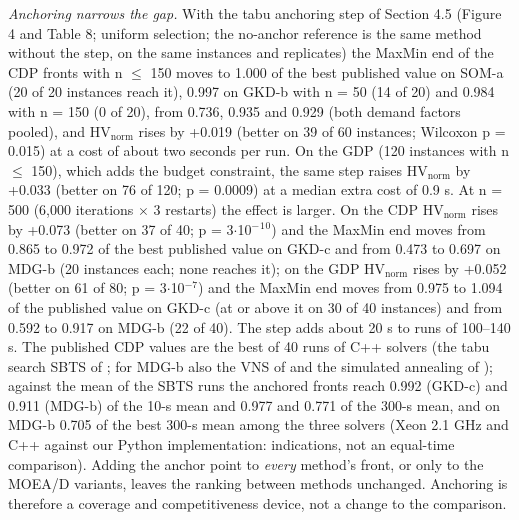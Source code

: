 \emph{Anchoring narrows the gap.} With the tabu anchoring step of Section 4.5 (Figure 4 and Table 8; uniform selection; the no-anchor reference is the same method without the step, on the same instances and replicates) the MaxMin end of the CDP fronts with n $\leq$ 150 moves to 1.000 of the best published value on SOM-a (20 of 20 instances reach it), 0.997 on GKD-b with n = 50 (14 of 20) and 0.984 with n = 150 (0 of 20), from 0.736, 0.935 and 0.929 (both demand factors pooled), and $\mathrm{HV}_{\mathrm{norm}}$ rises by +0.019 (better on 39 of 60 instances; Wilcoxon p = 0.015) at a cost of about two seconds per run. On the GDP (120 instances with n $\leq$ 150), which adds the budget constraint, the same step raises $\mathrm{HV}_{\mathrm{norm}}$ by +0.033 (better on 76 of 120; p = 0.0009) at a median extra cost of 0.9 s. At n = 500 (6,000 iterations $\times$ 3 restarts) the effect is larger. On the CDP $\mathrm{HV}_{\mathrm{norm}}$ rises by +0.073 (better on 37 of 40; p = 3$\cdot$10$^{-}$$^{1}$$^{0}$) and the MaxMin end moves from 0.865 to 0.972 of the best published value on GKD-c and from 0.473 to 0.697 on MDG-b (20 instances each; none reaches it); on the GDP $\mathrm{HV}_{\mathrm{norm}}$ rises by +0.052 (better on 61 of 80; p = 3$\cdot$10$^{-7}$) and the MaxMin end moves from 0.975 to 1.094 of the published value on GKD-c (at or above it on 30 of 40 instances) and from 0.592 to 0.917 on MDG-b (22 of 40). The step adds about 20 s to runs of 100--140 s. The published CDP values are the best of 40 runs of C++ solvers (the tabu search SBTS of \citet{lu2023}; for MDG-b also the VNS of \citet{mladenovic2022b} and the simulated annealing of \citet{rosati2024}); against the mean of the SBTS runs the anchored fronts reach 0.992 (GKD-c) and 0.911 (MDG-b) of the 10-s mean and 0.977 and 0.771 of the 300-s mean, and on MDG-b 0.705 of the best 300-s mean among the three solvers (Xeon 2.1 GHz and C++ against our Python implementation: indications, not an equal-time comparison). Adding the anchor point to \emph{every} method's front, or only to the MOEA/D variants, leaves the ranking between methods unchanged. Anchoring is therefore a coverage and competitiveness device, not a change to the comparison.

